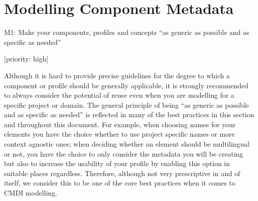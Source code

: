 \section{Modelling Component
Metadata}\label{modelling-component-metadata}

M1: Make your components, profiles and concepts ``as generic as possible
and as specific as needed''

{[}priority: high{]}

Although it is hard to provide precise guidelines for the degree to
which a component or profile should be generally applicable, it is
strongly recommended to always consider the potential of reuse even when
you are modelling for a specific project or domain. The general
principle of being ``as generic as possible and as specific as needed''
is reflected in many of the best practices in this section and
throughout this document. For example, when choosing names for your
elements you have the choice whether to use project specific names or
more context agnostic ones; when deciding whether an element should be
multilingual or not, you have the choice to only consider the metadata
you will be creating but also to increase the usability of your profile
by enabling this option in suitable places regardless. Therefore,
although not very prescriptive in and of itself, we consider this to be
one of the core best practices when it comes to CMDI modelling.
